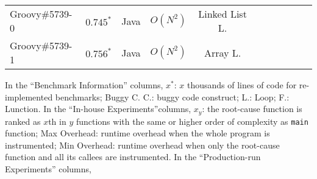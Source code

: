 \begin{table*}[h!]
{{\begin{tabular}{lcccc|ccc|ccc}
    \midrule
    Groovy\#5739-0        & $0.745^*$  & Java  & $O(N^{2})$ & Linked List L. &  &  &  &  &  &   \\
    Groovy\#5739-1        & $0.756^*$  & Java  &$O(N^{2})$  & Array L. &  &  &  &  &  &  \\
    \bottomrule
   \end{tabular}
   }
   }
  \vspace{0.1in}
   {In the ``Benchmark Information'' columns,
   $x^*$: $x$ thousands of lines of code for re-implemented benchmarks;
   Buggy C. C.: buggy code construct;
   L.: Loop; 
   F.: Lunction.
   In the ``In-house Experiments''columns,
   $x_{y}$: the root-cause function is ranked as $x$th in $y$ 
   functions with the same or higher order of complexity as \texttt{main} function;
   Max Overhead: runtime overhead when the whole program is instrumented;
   Min Overhead: runtime overhead when only the root-cause function and all its callees are instrumented.
   In the ``Production-run Experiments'' columns, 
   }
\vspace{-0.15in}
\end{table*}
